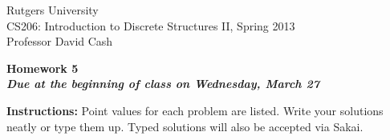 \documentclass[11pt]{article}
\begin{document}
\sloppy

\noindent Rutgers University\\
CS206: Introduction to Discrete Structures II, Spring 2013\\
Professor David Cash\\

\begin{center}
\LARGE{\textbf{Homework 5}}\\
\large{\textbf{\emph{Due at the beginning of class on Wednesday, March 27}}}
\end{center}

\vspace{.1in}

\noindent\textbf{Instructions:} Point values for each problem are listed.
Write your solutions neatly or type them up.  Typed solutions will also be
accepted via Sakai.
\end{document}
